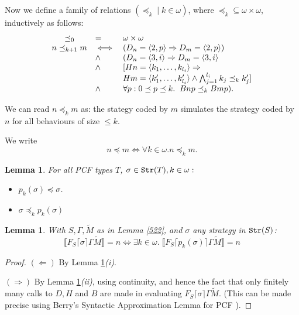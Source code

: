 \documentclass[11pt]{article}
\newtheorem{lemma}[theorem]{Lemma}
\newcommand{\lang}{\langle}
\newcommand{\rang}{\rangle}
\begin{document}
Now we define a family of relations $(\preceq_k\mid k\in\omega)$, where
$\preceq_k\subseteq\omega\times\omega$, inductively as follows:
\[\begin{array}{{cll}}
\preceq_0 &=& \omega\times\omega \\
n\preceq_{k+1} m& \iff& (D_n=\lang 2,p\rang\Rightarrow D_m=\lang
2,p\rang)\\
&\wedge & (D_n=\lang 3,i\rang\Rightarrow D_m=\lang 3,i\rang\\
&\wedge & [H n=\lang k_1,\dots,k_{l_i}\rang\Rightarrow \\
&&       H m =\lang k'_1,\dots,k'_{l_i}\rang\wedge \bigwedge_{j=1}^{l_i}
k_j\preceq_k k'_j ]\\
&\wedge &  \forall p: 0\preceq p\preceq k.\;\;  B n p \preceq_k B m p).
\end{array}\]

We can read $n\preceq_k m$ as: the stategy coded by $m$ simulates the
strategy coded by $n$ for all behaviours of size $\leq k$.

We write $$n\preceq m\iff \forall k\in\omega. n\preceq_k m.$$

\begin{lemma}\label{due}
For all PCF types $T$, $\sigma\in{\tt Str}(T), k\in\omega:$
\begin{itemize}
\item[(i)] $p_k(\sigma)\preceq\sigma$.
\item[(ii)] $\sigma\preceq_k p_k(\sigma)$
\end{itemize}
\end{lemma}

\begin{lemma}\label{tre}
With $S,\Gamma,\tilde{M}$ as in Lemma \ref{522}, and $\sigma$ any strategy
in ${\tt Str}(S)$:
$$\llbracket F_S\lceil\sigma\rceil\Gamma\tilde{M}\rrbracket
=n\iff\exists k\in\omega.\;\llbracket
F_S\lceil p_k(\sigma)\rceil\Gamma\tilde{M}\rrbracket =n$$
\end{lemma}

\begin{proof} $(\Leftarrow)$ By Lemma \ref{due}{\it (i)}.

$(\Rightarrow)$ By Lemma \ref{due}{\it (ii)}, using continuity,
and hence the fact that only finitely many calls to $D,H$ and $B$
are made in evaluating $F_S\lceil\sigma\rceil\Gamma\tilde{M}$.
(This can be made precise using Berry's Syntactic Approximation
Lemma for PCF \cite{BerryG:fulasl}).
\end{proof}
\end{document}
